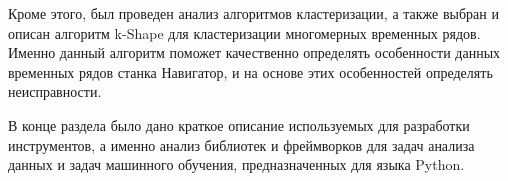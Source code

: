 Кроме этого, был проведен анализ алгоритмов кластеризации,
а также выбран и описан алгоритм k-Shape для кластеризации многомерных временных рядов.
Именно данный алгоритм поможет качественно определять особенности данных временных рядов станка Навигатор,
и на основе этих особенностей определять неисправности.

В конце раздела было дано краткое описание используемых для разработки инструментов,
а именно анализ библиотек и фреймворков для задач анализа данных и задач машинного обучения,
предназначенных для языка Python.



\clearpage